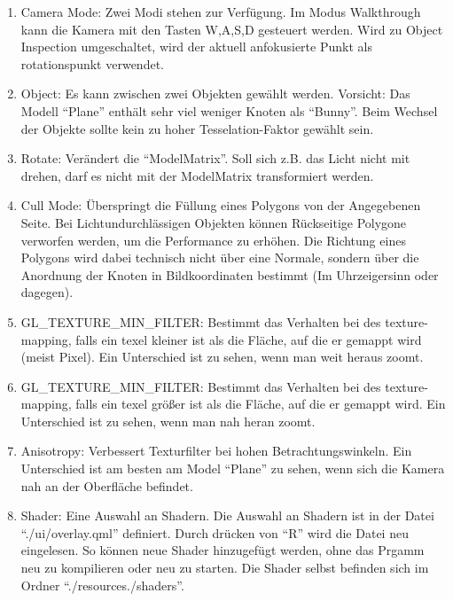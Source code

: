 \documentclass[a4paper,12pt]{article}
\begin{document}
\begin{enumerate}
\item
Camera Mode: Zwei Modi stehen zur Verfügung. Im Modus Walkthrough kann die Kamera mit den Tasten W,A,S,D gesteuert werden. Wird zu Object Inspection umgeschaltet, wird der aktuell anfokusierte Punkt als rotationspunkt verwendet.
\item
Object: Es kann zwischen zwei Objekten gewählt werden. Vorsicht: Das Modell "`Plane"' enthält sehr viel weniger Knoten als "`Bunny"'. Beim Wechsel der Objekte sollte kein zu hoher Tesselation-Faktor gewählt sein.
\item
Rotate: Verändert die "`ModelMatrix"'. Soll sich z.B. das Licht nicht mit drehen, darf es nicht mit der ModelMatrix transformiert werden.
\item
Cull Mode: Überspringt die Füllung eines Polygons von der Angegebenen Seite. Bei Lichtundurchlässigen Objekten können Rückseitige Polygone verworfen werden, um die Performance zu erhöhen. Die Richtung eines Polygons wird dabei technisch nicht über eine Normale, sondern über die Anordnung der Knoten in Bildkoordinaten bestimmt (Im Uhrzeigersinn oder dagegen).
\item
GL\_TEXTURE\_MIN\_FILTER: Bestimmt das Verhalten bei des texture-mapping, falls ein texel kleiner ist als die Fläche, auf die er gemappt wird (meist Pixel). Ein Unterschied ist zu sehen, wenn man weit heraus zoomt.
\item
GL\_TEXTURE\_MIN\_FILTER: Bestimmt das Verhalten bei des texture-mapping, falls ein texel größer ist als die Fläche, auf die er gemappt wird. Ein Unterschied ist zu sehen, wenn man nah heran zoomt.
\item Anisotropy: Verbessert Texturfilter bei hohen Betrachtungswinkeln. Ein Unterschied ist am besten am Model "`Plane"' zu sehen, wenn sich die Kamera nah an der Oberfläche befindet.
\item Shader: Eine Auswahl an Shadern. Die Auswahl an Shadern ist in der Datei "`./ui/overlay.qml"' definiert. Durch drücken von "`R"' wird die Datei neu eingelesen. So können neue Shader hinzugefügt werden, ohne das Prgamm neu zu kompilieren oder neu zu starten. Die Shader selbst befinden sich im Ordner "`./resources./shaders"'.
\end{enumerate}
\end{document}
